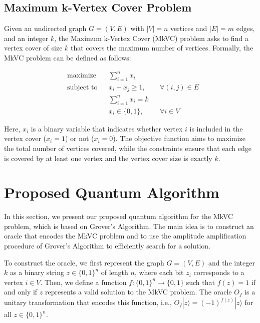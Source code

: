 \subsection{Maximum k-Vertex Cover Problem}\label{subsec:mkvc}

Given an undirected graph $G=(V, E)$ with $|V|=n$ vertices and $|E|=m$ edges, and an integer $k$, the Maximum k-Vertex Cover (MkVC) problem asks to find a vertex cover of size $k$ that covers the maximum number of vertices. Formally, the MkVC problem can be defined as follows:

\begin{equation}
\begin{aligned}
& \text{maximize} && \sum_{i=1}^n x_i \\
& \text{subject to} && x_i + x_j \ge 1, && \forall (i, j) \in E \\
& && \sum_{i=1}^n x_i = k \\
& && x_i \in \{0, 1\}, && \forall i \in V
\end{aligned}
\end{equation}

Here, $x_i$ is a binary variable that indicates whether vertex $i$ is included in the vertex cover ($x_i=1$) or not ($x_i=0$). The objective function aims to maximize the total number of vertices covered, while the constraints ensure that each edge is covered by at least one vertex and the vertex cover size is exactly $k$.

\section{Proposed Quantum Algorithm}\label{sec:algorithm}

In this section, we present our proposed quantum algorithm for the MkVC problem, which is based on Grover's Algorithm. The main idea is to construct an oracle that encodes the MkVC problem and to use the amplitude amplification procedure of Grover's Algorithm to efficiently search for a solution.

To construct the oracle, we first represent the graph $G=(V, E)$ and the integer $k$ as a binary string $z \in \{0, 1\}^n$ of length $n$, where each bit $z_i$ corresponds to a vertex $i \in V$. Then, we define a function $f: \{0,1\}^n \rightarrow \{0,1\}$ such that $f(z)=1$ if and only if $z$ represents a valid solution to the MkVC problem. The oracle $O_f$ is a unitary transformation that encodes this function, i.e., $O_f |z\rangle = (-1)^{f(z)} |z\rangle$ for all $z \in \{0, 1\}^n$.

